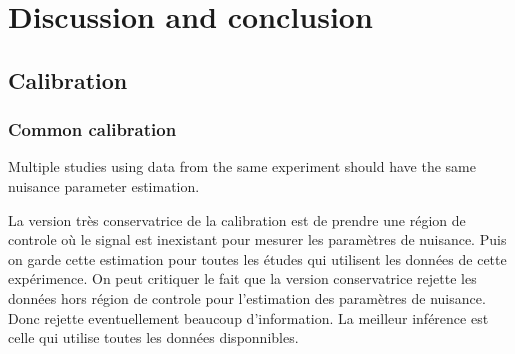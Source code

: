 \chapter{Discussion and conclusion}
\label{chap:conclusion}
\ifpdf
    \graphicspath{{Chapter6/Figs/Raster/}{Chapter6/Figs/PDF/}{Chapter6/Figs/}}
\else
    \graphicspath{{Chapter6/Figs/Vector/}{Chapter6/Figs/}}
\fi







\section{Calibration} %
\label{sec:calibration}

\subsection{Common calibration} %
\label{sub:common_calibration}


Multiple studies using data from the same experiment should have the same nuisance parameter estimation.

La version très conservatrice de la calibration est de prendre une région de controle où le signal est inexistant pour mesurer les paramètres de nuisance.
Puis on garde cette estimation pour toutes les études qui utilisent les données de cette expérimence.
On peut critiquer le fait que la version conservatrice rejette les données hors région de controle pour l'estimation des paramètres de nuisance.
Donc rejette eventuellement beaucoup d'information.
La meilleur inférence est celle qui utilise toutes les données disponnibles.

